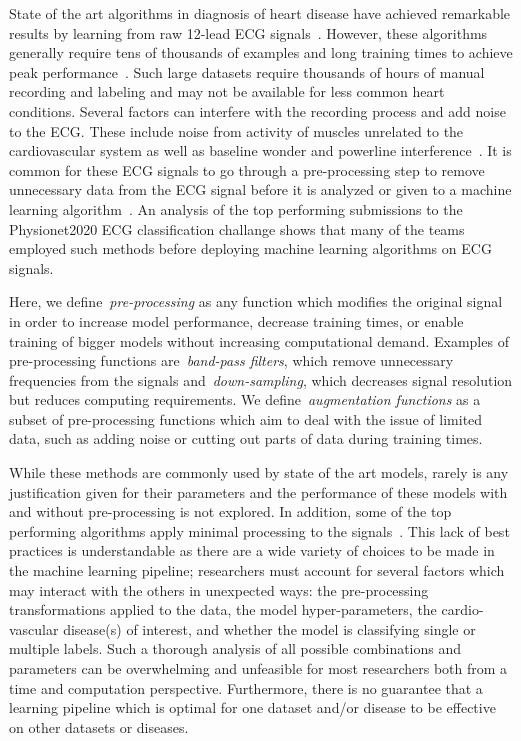 \documentclass{article}
\begin{document}
State of the art algorithms in diagnosis of heart disease have achieved remarkable results by learning from raw 12-lead ECG signals~\cite{reyna2021will,reyna4issues}. However, these algorithms generally require tens of thousands of examples and long training times to achieve peak performance~\cite{reyna2021will,reyna4issues,natarajan2020wide}. Such large datasets require thousands of hours of manual recording and labeling and may not be available for less common heart conditions. Several factors can interfere with the recording process and add noise to the ECG. These include noise from activity of muscles unrelated to the cardiovascular system as well as baseline wonder and powerline interference~\cite{sornmo2006electrocardiogram}. It is common for these ECG signals to go through a pre-processing step to remove unnecessary data from the ECG signal before it is analyzed or given to a machine learning algorithm~\cite{gacek2011ecg,sornmo2006electrocardiogram}. An analysis of the top performing submissions to the Physionet2020 ECG classification challange shows that many of the teams employed such methods before deploying machine learning algorithms on ECG signals.

Here, we define~\textit{pre-processing} as any function which modifies the original signal in order to increase model performance, decrease training times, or enable training of bigger models without increasing computational demand. Examples of pre-processing functions are~\textit{band-pass filters}, which remove unnecessary frequencies from the signals and~\textit{down-sampling}, which decreases signal resolution but reduces computing requirements.  We define~\textit{augmentation functions} as a subset of pre-processing functions which aim to deal with the issue of limited data, such as adding noise or cutting out parts of data during training times.



While these methods are commonly used by state of the art models, rarely is any justification given for their parameters and the performance of these models with and without pre-processing is not explored. In addition, some of the top performing algorithms apply minimal processing to the signals~\cite{natarajan2020wide,ribeiro2020automatic}. This lack of best practices is understandable as there are a wide variety of choices to be made in the machine learning pipeline; researchers must account for several factors which may interact with the others in unexpected ways: the pre-processing transformations applied to the data, the model hyper-parameters, the cardio-vascular disease(s) of interest, and whether the model is classifying single or multiple labels. Such a thorough analysis of all possible combinations and parameters can be overwhelming and unfeasible for most researchers both from a time and computation perspective. Furthermore, there is no guarantee that a learning pipeline which is optimal for one dataset and/or disease to be effective on other datasets or diseases. 
\end{document}
